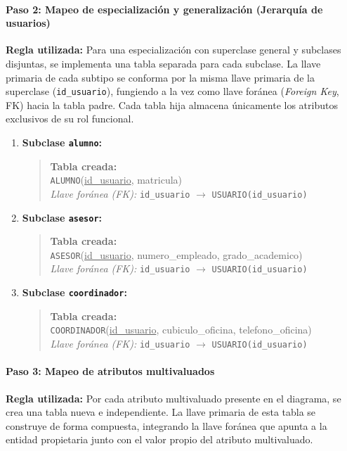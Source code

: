 \paragraph{Paso 2: Mapeo de especialización y generalización (Jerarquía de usuarios)}
\textbf{Regla utilizada:} Para una especialización con superclase general y subclases disjuntas, se implementa una tabla separada para cada subclase. La llave primaria de cada subtipo se conforma por la misma llave primaria de la superclase (\texttt{id\_usuario}), fungiendo a la vez como llave foránea (\textit{Foreign Key}, FK) hacia la tabla padre. Cada tabla hija almacena únicamente los atributos exclusivos de su rol funcional.

\begin{enumerate}
    \item \textbf{Subclase \texttt{alumno}:}
    \begin{quote}
        \textbf{Tabla creada:} \\
        \texttt{ALUMNO}(\underline{id\_usuario}, matricula) \\
        \textit{Llave foránea (FK):} \texttt{id\_usuario} $\rightarrow$ \texttt{USUARIO(id\_usuario)}
    \end{quote}

    \item \textbf{Subclase \texttt{asesor}:}
    \begin{quote}
        \textbf{Tabla creada:} \\
        \texttt{ASESOR}(\underline{id\_usuario}, numero\_empleado, grado\_academico) \\
        \textit{Llave foránea (FK):} \texttt{id\_usuario} $\rightarrow$ \texttt{USUARIO(id\_usuario)}
    \end{quote}

    \item \textbf{Subclase \texttt{coordinador}:}
    \begin{quote}
        \textbf{Tabla creada:} \\
        \texttt{COORDINADOR}(\underline{id\_usuario}, cubiculo\_oficina, telefono\_oficina) \\
        \textit{Llave foránea (FK):} \texttt{id\_usuario} $\rightarrow$ \texttt{USUARIO(id\_usuario)}
    \end{quote}
\end{enumerate}

\paragraph{Paso 3: Mapeo de atributos multivaluados}
\textbf{Regla utilizada:} Por cada atributo multivaluado presente en el diagrama, se crea una tabla nueva e independiente. La llave primaria de esta tabla se construye de forma compuesta, integrando la llave foránea que apunta a la entidad propietaria junto con el valor propio del atributo multivaluado.


